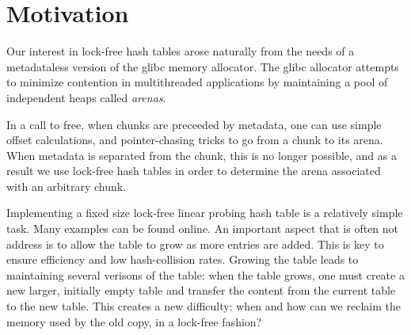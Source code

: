 \section{Motivation}
\label{sec:intro}

Our interest in lock-free hash tables arose naturally from the needs
of a metadataless version of the glibc memory allocator.  The glibc
allocator attempts to minimize contention in multithreaded
applications by maintaining a pool of independent heaps called \emph{arenas}.

In a call to free, when chunks are preceeded by metadata, one can use
simple offset calculations, and pointer-chasing tricks to go from a
chunk to its arena. When metadata is separated from the chunk,
this is no longer possible, and as a result we use lock-free hash
tables in order to determine the arena associated with an arbitrary
chunk.

Implementing a fixed size lock-free linear probing hash table is a
relatively simple task. Many examples can be found online. An
important aspect that is often not address is to allow the table to
grow as more entries are added. This is key to ensure efficiency and
low hash-collision rates. Growing the table leads to maintaining
several verisons of the table: when the table grows, one must create a
new larger, initially empty table and transfer the content from the
current table to the new table. This creates a new difficulty: when
and how can we reclaim the memory used by the old copy, in a lock-free
fashion?


